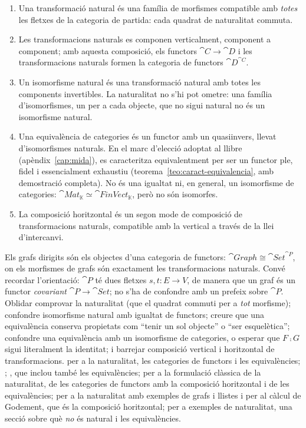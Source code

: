 \begin{resumcap}
\begin{enumerate}
  \item Una transformació natural és una família de morfismes compatible amb \emph{totes} les fletxes de la categoria de partida: cada quadrat de naturalitat commuta.
  \item Les transformacions naturals es componen verticalment, component a component; amb aquesta composició, els functors $\cat{C}\to\cat{D}$ i les transformacions naturals formen la categoria de functors $\cat{D}^{\cat{C}}$.
  \item Un isomorfisme natural és una transformació natural amb totes les components invertibles. La naturalitat no s'hi pot ometre: una família d'isomorfismes, un per a cada objecte, que no sigui natural no és un isomorfisme natural.
  \item Una equivalència de categories és un functor amb un quasiinvers, llevat d'isomorfismes naturals. En el marc d'elecció adoptat al llibre (apèndix~\ref{cap:mida}), es caracteritza equivalentment per ser un functor ple, fidel i essencialment exhaustiu (teorema~\ref{teo:caract-equivalencia}, amb demostració completa). No és una igualtat ni, en general, un isomorfisme de categories: $\cat{Mat}_{\mathbb K}\simeq\cat{FinVect}_{\mathbb K}$, però no són isomorfes.
  \item La composició horitzontal és un segon mode de composició de transformacions naturals, compatible amb la vertical a través de la llei d'intercanvi.
\end{enumerate}
 Els grafs dirigits són els objectes d'una categoria de functors: $\cat{Graph}\cong\cat{Set}^{\cat{P}}$, on els morfismes de grafs són exactament les transformacions naturals. Convé recordar l'orientació: $\cat{P}$ té dues fletxes $s,t\colon E\to V$, de manera que un graf és un functor \emph{covariant} $\cat{P}\to\cat{Set}$; no s'ha de confondre amb un prefeix sobre $\cat{P}$.
 Oblidar comprovar la naturalitat (que el quadrat commuti per a \emph{tot} morfisme); confondre isomorfisme natural amb igualtat de functors; creure que una equivalència conserva propietats com \enquote{tenir un sol objecte} o \enquote{ser esquelètica}; confondre una equivalència amb un isomorfisme de categories, o esperar que $F\comp G$ sigui literalment la identitat; i barrejar composició vertical i horitzontal de transformacions.
 \cite[§§7.4--7.10]{awodey} per a la naturalitat, les categories de functors i les equivalències; \cite[§§1.4--1.5]{riehl}; \cite[§1.3]{leinster}, que inclou també les equivalències; \cite[I.4, II.4--II.5 i IV.4]{maclane} per a la formulació clàssica de la naturalitat, de les categories de functors amb la composició horitzontal i de les equivalències; \cite[§§4.2--4.4]{barrwells} per a la naturalitat amb exemples de grafs i llistes i per al càlcul de Godement, que és la composició horitzontal; \cite[§1.4 i §1.5.4]{perrone-notes} per a exemples de naturalitat, una secció sobre què \emph{no} és natural i les equivalències.
\end{resumcap}
